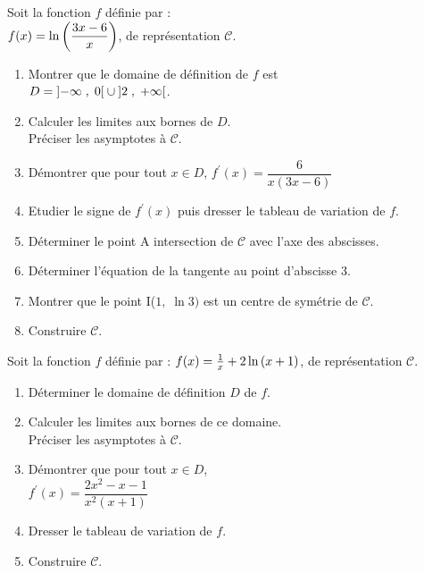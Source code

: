   \begin{exercice}

\medskip

 Soit la fonction $ f $ définie par : \\$ f(x)=\ln\left(\dfrac{3x-6}{x}\right)  $, de  représentation $ \mathscr{C} $.
 \begin{enumerate}
 \item Montrer que le domaine de définition de $ f $  est\\ $D=\left]-\infty \;,\; 0\right[ \cup\left]2 \;,\; +\infty\right[ $.
 \item Calculer les limites aux bornes de $ D $. \\Préciser les asymptotes à $ \mathscr{C} $.
 \item Démontrer que pour tout $ x\in D$,\; $ f^{\prime}(x)=\dfrac{6}{x(3x-6)} $
  \item Etudier le signe de  $  f^{\prime}(x) $ puis dresser le tableau de variation de $ f. $
  \item Déterminer le point   A intersection de $ \mathscr{C} $ avec l'axe des abscisses.
  \item Déterminer l'équation de la tangente au point d'abscisse $ 3 $.
  \item Montrer que le point I($ 1,\; \ln 3) $  est un centre de symétrie de $ \mathscr{C} $.
  \item Construire $ \mathscr{C} $.
 \end{enumerate}
  \end{exercice}
  
   \begin{exercice}


 Soit la fonction $ f $ définie par : $ f(x)=\frac{1}{x}+2\ln\left(x+1\right)  $, de  représentation $ \mathscr{C} $.
 \begin{enumerate}
 \item Déterminer le domaine de définition $ D $   de $ f. $
 \item Calculer les limites aux bornes de  ce domaine. \\Préciser les asymptotes à $ \mathscr{C} $.
 \item Démontrer que pour tout $ x\in D$,\\ $ f^{\prime}(x)=\dfrac{2x^{2}-x-1}{x^{2}(x+1)} $
  \item Dresser le tableau de variation de $ f. $
  \item Construire $ \mathscr{C} $.
 \end{enumerate}
  \end{exercice}
  
